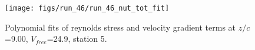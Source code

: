 \begin{figure}[H]
\centering
\texttt{[image: figs/run\_46/run\_46\_nut\_tot\_fit]}
\caption{Polynomial fits of reynolds stress and velocity gradient terms at $z/c$=9.00, $V_{free}$=24.9, station 5.}
\label{fig:run_46_nut_tot_fit}
\end{figure}


